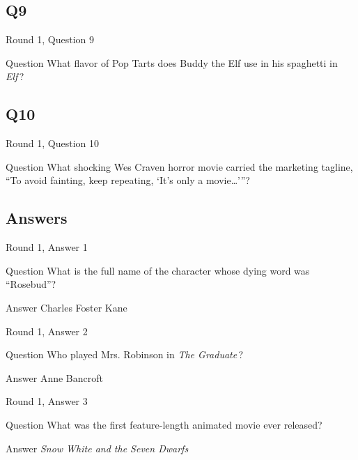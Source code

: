 \documentclass[11pt]{beamer}
\begin{document}
\subsection*{Q9}
\begin{frame}[t]{Round 1, Question 9}
\vspace{2em}
\begin{block}{Question}
What flavor of Pop Tarts does Buddy the Elf use in his spaghetti in \emph{Elf}\,?
\end{block}
\end{frame}
    

\subsection*{Q10}
\begin{frame}[t]{Round 1, Question 10}
\vspace{2em}
\begin{block}{Question}
What shocking Wes Craven horror movie carried the marketing tagline, ``To avoid fainting, keep repeating, `It's only a movie…'{}''?
\end{block}
\end{frame}
    
\subsection{Answers}

\begin{frame}[t]{Round 1, Answer 1}
\vspace{2em}
\begin{block}{Question}
What is the full name of the character whose dying word was ``Rosebud''?
\end{block}
\pause{}
\begin{block}{Answer}
Charles Foster Kane
\end{block}
\end{frame}
    

\begin{frame}[t]{Round 1, Answer 2}
\vspace{2em}
\begin{block}{Question}
Who played Mrs. Robinson in \emph{The Graduate}\,?
\end{block}
\pause{}
\begin{block}{Answer}
Anne Bancroft
\end{block}
\end{frame}
    

\begin{frame}[t]{Round 1, Answer 3}
\vspace{2em}
\begin{block}{Question}
What was the first feature-length animated movie ever released?
\end{block}
\pause{}
\begin{block}{Answer}
\emph{Snow White and the Seven Dwarfs}
\end{block}
\end{frame}
    
\end{document}
